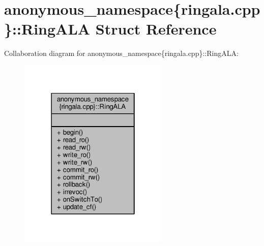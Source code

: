 \hypertarget{structanonymous__namespace_02ringala_8cpp_03_1_1RingALA}{\section{anonymous\-\_\-namespace\{ringala.\-cpp\}\-:\-:Ring\-A\-L\-A Struct Reference}
\label{structanonymous__namespace_02ringala_8cpp_03_1_1RingALA}
}


Collaboration diagram for anonymous\-\_\-namespace\{ringala.\-cpp\}\-:\-:Ring\-A\-L\-A\-:
\nopagebreak
\begin{figure}[H]
\begin{center}
\leavevmode
\includegraphics[width=202pt]{structanonymous__namespace_02ringala_8cpp_03_1_1RingALA__coll__graph}
\end{center}
\end{figure}
